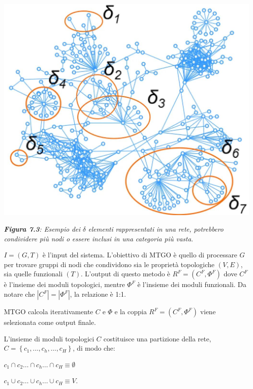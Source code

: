 \documentclass[11pt]{article}
\begin{document}
\begin{center}
\includegraphics[scale=0.35]{delta}

\begin{small}\textit{\textbf{Figura 7.3}: Esempio dei $\delta$ elementi rappresentati in una rete, potrebbero condividere più nodi o essere inclusi in una categoria più vasta}.\end{small}
\end{center}

$I = (G,T)$ è l'input del sistema. L'obiettivo di MTGO è quello di processare $G$ per trovare gruppi di nodi che condividono sia le proprietà topologiche $(V,E)$, sia quelle funzionali $(T)$. L'output di questo metodo è $R^F = (C^F, \Phi^F)$ dove $C^F$ è l'insieme dei moduli topologici, mentre $\Phi^F$ è l'insieme dei moduli funzionali. Da notare che $|C^F| = |\Phi^F|$, la relazione è 1:1. 

MTGO calcola iterativamente $C$ e $\Phi$ e la coppia $R^F = (C^F, \Phi^F)$ viene selezionata come output finale.

L'insieme di moduli topologici $C$ costituisce una partizione della rete, $C = \left \{c_1, ..., c_h, ..., c_H\right \}$, di modo che:

\begin{center}
$c_1 \cap c_2 ... \cap c_h ... \cap c_H \equiv \emptyset$
\end{center}
\begin{center}
 $c_1 \cup c_2 ... \cup c_h ... \cup c_H \equiv V$.
\end{center}
\end{document}
